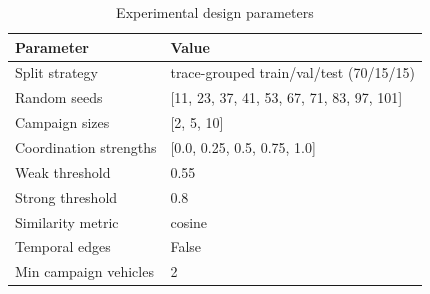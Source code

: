 \begin{table}[t]
\centering
\begin{tabular}{ll}
\toprule
Parameter & Value \\
\midrule
Split strategy & trace-grouped train/val/test (70/15/15) \\
Random seeds & [11, 23, 37, 41, 53, 67, 71, 83, 97, 101] \\
Campaign sizes & [2, 5, 10] \\
Coordination strengths & [0.0, 0.25, 0.5, 0.75, 1.0] \\
Weak threshold & 0.55 \\
Strong threshold & 0.8 \\
Similarity metric & cosine \\
Temporal edges & False \\
Min campaign vehicles & 2 \\
\bottomrule
\end{tabular}
\caption{Experimental design parameters}
\label{tab:experimental_design}
\end{table}
